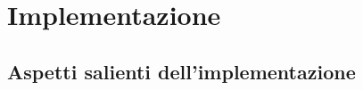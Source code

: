 \chapter{Implementazione}
\label{chap:implementazione}
    \section{Aspetti salienti dell'implementazione}
    \label{sec:aspetti_salienti_implementazione}